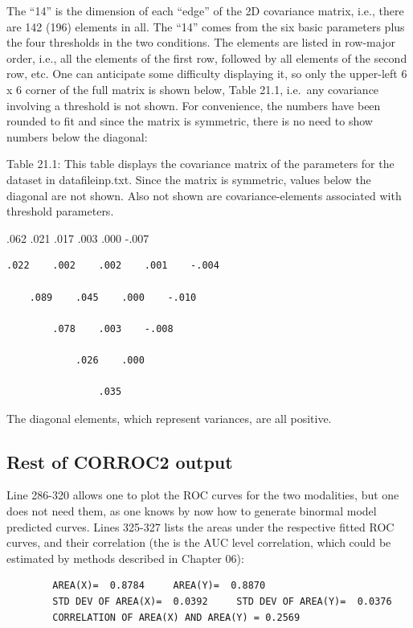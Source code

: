 \documentclass[
]{book}
\begin{document}
The ``14'' is the dimension of each ``edge'' of the 2D covariance matrix, i.e., there are 142 (196) elements in all. The ``14'' comes from the six basic parameters plus the four thresholds in the two conditions. The elements are listed in row-major order, i.e., all the elements of the first row, followed by all elements of the second row, etc. One can anticipate some difficulty displaying it, so only the upper-left 6 x 6 corner of the full matrix is shown below, Table 21.1, i.e.~any covariance involving a threshold is not shown. For convenience, the numbers have been rounded to fit and since the matrix is symmetric, there is no need to show numbers below the diagonal:

Table 21.1: This table displays the covariance matrix of the parameters for the dataset in datafileinp.txt. Since the matrix is symmetric, values below the diagonal are not shown. Also not shown are covariance-elements associated with threshold parameters.

.062 .021 .017 .003 .000 -.007

\begin{verbatim}
.022    .002    .002    .001    -.004

    .089    .045    .000    -.010

        .078    .003    -.008

            .026    .000

                .035
\end{verbatim}

The diagonal elements, which represent variances, are all positive.

\hypertarget{bivariate-binormal-model-corroc2-output-restof}{%
\subsection{Rest of CORROC2 output}\label{bivariate-binormal-model-corroc2-output-restof}}

Line 286-320 allows one to plot the ROC curves for the two modalities, but one does not need them, as one knows by now how to generate binormal model predicted curves. Lines 325-327 lists the areas under the respective fitted ROC curves, and their correlation (the is the AUC level correlation, which could be estimated by methods described in Chapter 06):

\begin{verbatim}
        AREA(X)=  0.8784     AREA(Y)=  0.8870
        STD DEV OF AREA(X)=  0.0392     STD DEV OF AREA(Y)=  0.0376
        CORRELATION OF AREA(X) AND AREA(Y) = 0.2569
\end{verbatim}
\end{document}
